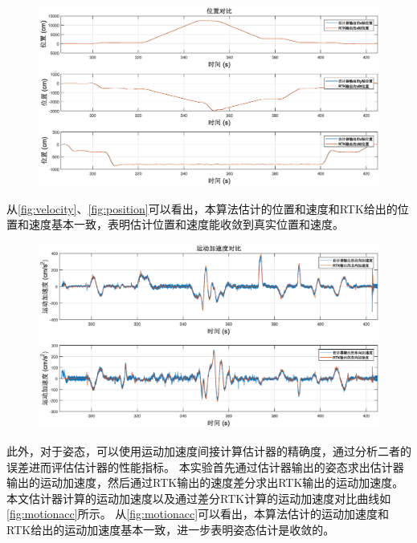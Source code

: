 \documentclass[
  type=master
]{gdutthesis}
\begin{document}
\begin{figure}[H]
	\centering
	\includegraphics[width=1.0\textwidth]{position3.eps}
	\label{fig:position}
\end{figure}
从\autoref{fig:velocity}、\autoref{fig:position}可以看出，本算法估计的位置和速度和RTK给出的位置和速度基本一致，表明估计位置和速度能收敛到真实位置和速度。
\begin{figure}[H]
	\centering
	\includegraphics[width=1.0\textwidth]{motionacc3.eps}
	\label{fig:motionacc}
\end{figure}

此外，对于姿态，可以使用运动加速度间接计算估计器的精确度，通过分析二者的误差进而评估估计器的性能指标。
本实验首先通过估计器输出的姿态求出估计器输出的运动加速度，然后通过RTK输出的速度差分求出RTK输出的运动加速度。
本文估计器计算的运动加速度以及通过差分RTK计算的运动加速度对比曲线如\autoref{fig:motionacc}所示。
从\autoref{fig:motionacc}可以看出，本算法估计的运动加速度和RTK给出的运动加速度基本一致，进一步表明姿态估计是收敛的。
\end{document}
